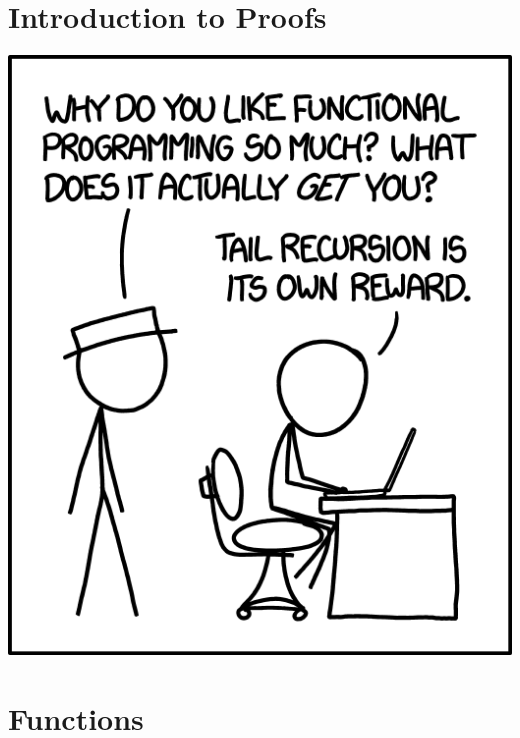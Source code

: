 \documentclass[oneside]{book}
\begin{document}
\chapter{Introduction to Proofs} \label{appendix:a}

    

\begin{savequote}
    \includegraphics[scale=0.7]{Graphics/functions.png}
\end{savequote}
    \chapter{Functions} \label{appendix:b}
    
        
\end{document}
